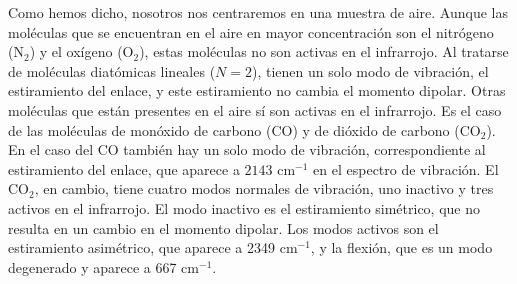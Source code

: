 \documentclass{tufte-book}
\begin{document}
Como hemos dicho, nosotros nos centraremos en una muestra de aire. Aunque 
las moléculas que se encuentran en el aire en mayor concentración son 
el nitrógeno (N$_2$) y el oxígeno (O$_2$), estas moléculas no son activas 
en el infrarrojo. Al tratarse de moléculas diatómicas lineales ($N=2$), 
tienen un solo modo de vibración, el estiramiento del enlace, y este 
estiramiento no cambia el momento dipolar. Otras moléculas que están 
presentes en el aire sí son activas en el infrarrojo. Es el caso de las 
moléculas de monóxido de carbono (CO) y de dióxido de carbono (CO$_2$).
En el caso del CO también hay un solo modo de vibración, correspondiente 
al estiramiento del enlace, que aparece a $2143$ cm$^{-1}$ en el espectro 
de vibración. El CO$_2$, en cambio, tiene cuatro modos normales de vibración, 
uno inactivo y tres activos en el infrarrojo. El modo inactivo es el 
estiramiento simétrico, que no resulta en un cambio en el momento dipolar.
Los modos activos son el estiramiento asimétrico, que aparece a 2349 cm$^{-1}$,
y la flexión, que es un modo degenerado y aparece a 667 cm$^{-1}$.
\end{document}
